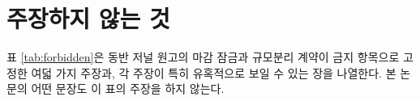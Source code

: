 \section{주장하지 않는 것}
\label{sec:disc-forbidden}

표 \ref{tab:forbidden}은 동반 저널 원고의 마감 잠금과 규모분리 계약이 금지 항목으로 고정한 여덟 가지 주장과, 각 주장이 특히 유혹적으로 보일 수 있는 장을 나열한다. 본 논문의 어떤 문장도 이 표의 주장을 하지 않는다.


